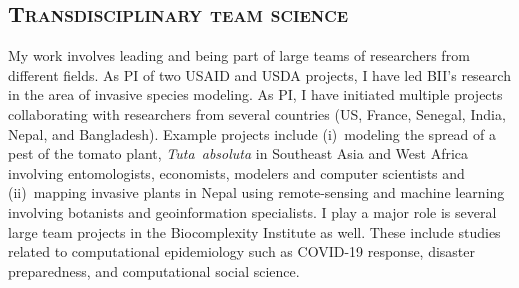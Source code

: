 \documentclass[margin,10pt]{res} %
\newcommand{\tutafull}{\emph{Tuta~absoluta}}
\begin{document}
\begin{resume}
{\section{\textnormal{\textsc{Transdisciplinary team science}}}
My work involves leading and being part of large teams of researchers from
different fields.  As PI of two USAID and USDA projects, I have led BII’s
research in the area of invasive species modeling. As PI, I have initiated
multiple projects collaborating with researchers from several countries
(US, France, Senegal, India, Nepal, and Bangladesh). Example projects
include (i)~modeling the spread of a pest of the tomato plant, \tutafull{} in
Southeast Asia and West Africa involving entomologists, economists,
modelers and computer scientists and (ii)~mapping invasive plants in Nepal
using remote-sensing and machine learning involving botanists and
geoinformation specialists. I play a major role is several large team projects in the
Biocomplexity Institute as well. These include studies related to
computational epidemiology such as COVID-19 response, disaster
preparedness, and computational social science.

}
\end{resume}
\end{document}
